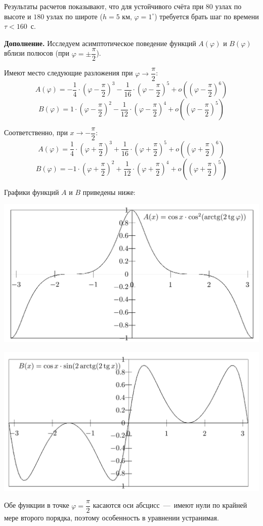 \documentclass[2pt, a4paper, fleqn]{extarticle}
\begin{document}
Результаты расчетов показывают, что для устойчивого счёта при $80$ узлах по высоте и $180$ узлах по широте ($h = 5$ км, $\varphi = 1^\circ$) требуется брать шаг по времени $\tau < 160$~с.

\bigskip

{\bf Дополнение.} Исследуем асимптотическое поведение функций $A(\varphi)$ и $B(\varphi)$ вблизи полюсов (при $\varphi = \pm\dfrac{\pi}{2}$).


Имеют место следующие разложения при $\varphi\rightarrow\dfrac{\pi}{2}$: $$A(\varphi)=-\dfrac{1}{4}\cdot\left(\varphi-\dfrac{\pi}{2}\right)^3-\dfrac{1}{16}\cdot\left(\varphi-\dfrac{\pi}{2}\right)^5+o\left(\left(\varphi-\dfrac{\pi}{2}\right)^6\right)$$ $$B(\varphi) = 1\cdot\left(\varphi-\dfrac{\pi}{2}\right)^2-\dfrac{1}{12}\cdot \left(\varphi-\dfrac{\pi}{2}\right)^4+o\left(\left(\varphi-\dfrac{\pi}{2}\right)^5\right)$$

Соответственно, при $x\rightarrow-\dfrac{\pi}{2}$: $$A(\varphi)=\dfrac{1}{4}\cdot\left(\varphi+\dfrac{\pi}{2}\right)^3+\dfrac{1}{16}\cdot\left(\varphi+\dfrac{\pi}{2}\right)^5+o\left(\left(\varphi+\dfrac{\pi}{2}\right)^6\right)$$ $$B(\varphi) = -1\cdot\left(\varphi+\dfrac{\pi}{2}\right)^2+\dfrac{1}{12}\cdot \left(\varphi+\dfrac{\pi}{2}\right)^4+o\left(\left(\varphi+\dfrac{\pi}{2}\right)^5\right)$$


Графики функций $A$ и $B$ приведены ниже: 

\includegraphics[scale=0.25]{A}

\includegraphics[scale=0.25]{B}

Обе функции в точке $\varphi = \dfrac{\pi}{2}$ касаются оси абсцисс~---~имеют нули по крайней мере второго порядка, поэтому особенность в уравнении устранимая.
\end{document}
